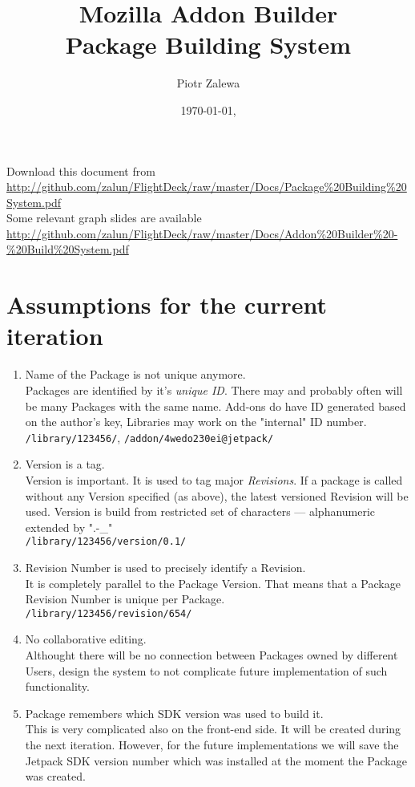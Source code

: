\documentclass[10pt]{article}
\title{Mozilla Addon Builder\\ Package Building System}
\author{Piotr Zalewa}
\date{\today, \version}
\begin{document}
\maketitle

{\scriptsize
	\noindent Download this document from \\
\url{http://github.com/zalun/FlightDeck/raw/master/Docs/Package%20Building%20System.pdf}\\
}{\scriptsize
	\noindent Some relevant graph slides are available \\
	\url{http://github.com/zalun/FlightDeck/raw/master/Docs/Addon%20Builder%20-%20Build%20System.pdf}
}

\section{Assumptions for the current iteration}

	\begin{enumerate}
		\item{Name of the Package is not unique anymore.\\
			Packages are identified by it's {\em unique ID}. There may and probably often will be many
			Packages with the same name. Add-ons do have ID generated based on the author's key, 
			Libraries may work on the "internal" ID number.\\
			{\tt /library/123456/}}, {\tt /addon/4wedo230ei@jetpack/ }
		\item{Version is a tag.\\
			Version is important. It is used to tag major {\em Revisions}. If a package is called without any
			Version specified (as above), the latest versioned Revision will be used. Version is build from 
			restricted set of characters --- alphanumeric extended by ".-\_"\\
			{\tt /library/123456/version/0.1/}}
		\item{Revision Number is used to precisely identify a Revision.\\
			It is completely parallel to the Package Version. That means that a Package Revision Number is 
			unique per Package.\\
			{\tt /library/123456/revision/654/}}
		\item{No collaborative editing.\\
			Althought there will be no connection between Packages owned by different Users, design the 
			system to not complicate future implementation of such functionality.}
		\item{Package remembers which SDK version was used to build it.\\
			This is very complicated also on the front-end side. It will be created during the next
			iteration. However, for the future implementations we will save the Jetpack SDK version number 
			which was installed at the moment the Package was created.}
	\end{enumerate}
\end{document}
